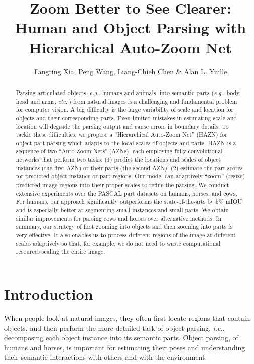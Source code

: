 \documentclass[runningheads]{llncs}
\makeatletter
\DeclareRobustCommand\onedot{\futurelet\@let@token\@onedot}
\def\@onedot{\ifx\@let@token.\else.\null\fi\xspace}
\def\eg{\emph{e.g}\onedot} \def\Eg{\emph{E.g}\onedot}
\def\ie{\emph{i.e}\onedot} \def\Ie{\emph{I.e}\onedot}
\def\etc{\emph{etc}\onedot} \def\vs{\emph{vs}\onedot}
\makeatother
\begin{document}
\pagestyle{headings}
\mainmatter
\def\ECCV16SubNumber{0000}  

\title{Zoom Better to See Clearer: Human and Object Parsing with Hierarchical Auto-Zoom Net}
\author{Fangting Xia, Peng Wang, Liang-Chieh Chen \& Alan L. Yuille}
\maketitle
\begin{abstract}
Parsing articulated objects, \eg humans and animals, into semantic parts (\eg body, head and arms, \etc) from natural images is a challenging and fundamental problem for computer vision. A big difficulty is the large variability of scale and location for objects and their corresponding parts. Even limited mistakes in estimating scale and location will degrade the parsing output and cause errors in boundary details. To tackle these difficulties,  we propose a ``Hierarchical Auto-Zoom Net'' (HAZN) for object part parsing which adapts to the local scales of objects and parts. HAZN is a sequence of two ``Auto-Zoom Nets" (AZNs), each employing fully convolutional networks that perform two tasks: (1) predict the locations and scales of object instances (the first AZN) or their parts (the second AZN); (2) estimate the part scores for predicted object instance or part regions. Our model can adaptively ``zoom'' (resize) predicted image regions into their proper scales to refine the parsing. We conduct extensive experiments over the PASCAL part datasets on humans, horses, and cows. For humans, our approach significantly outperforms the state-of-the-arts by $5\%$ mIOU and is especially better at segmenting small instances and small parts. We obtain similar improvements for parsing cows and horses over alternative methods. In summary, our strategy of first zooming into objects and then zooming into parts is very effective. It also enables us to process different regions of the image at different scales adaptively so that, for example, we do not need to waste computational resources scaling the entire image.
\end{abstract}

\section{Introduction}
When people look at natural images, they often first locate regions that contain objects, and then perform the more detailed task of object parsing, \ie decomposing each object instance into its semantic parts. Object parsing, of humans and horses, is important for estimating their poses and understanding their semantic interactions with others and with the environment.
\end{document}
